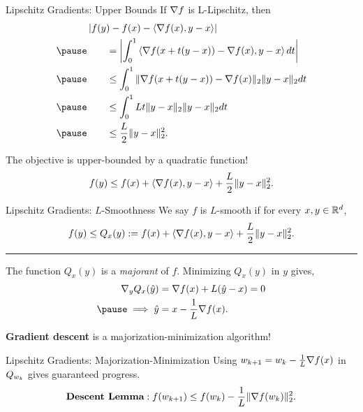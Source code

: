\documentclass[usenames,dvipsnames,mathserif,notheorems]{beamer}
\newcommand{\horizontalrule}{
	{
			\vspace{-0.5em}
			\center \rule{\textwidth}{0.1em}
			\vspace{-0.2em}
		}
}
\newcommand{\bad}[1]{\textcolor{bad}{#1}}
\newcommand{\good}[1]{\textcolor{good}{#1}}
\begin{document}
\begin{frame}{Lipschitz Gradients: Upper Bounds}
    If \( \nabla f \) is L-Lipschitz, then
    \begin{align*}
               & \abs{f(y) - f(x) - \abr{\grad(x), y - x}}                                            \\
        \pause & \hspace{2em} = \abs{\int_0^1 \abr{\grad(x + t(y - x)) - \grad(x), y - x} dt}         \\
        \pause & \hspace{2em} \leq \int_0^1 \norm{\grad(x + t(y - x)) - \grad(x)}_2 \norm{y - x}_2 dt \\
        \pause & \hspace{2em} \leq \int_0^1 L t \norm{y - x}_2 \norm{y - x}_2 dt                      \\
        \pause & \hspace{2em} \leq \frac{L}{2} \norm{y - x}^2_2.
    \end{align*}

    \pause

    The objective is upper-bounded by a \good{quadratic function}!
    \[
        f(y) \leq f(x) + \left\langle\nabla f(x), y - x\right\rangle + \frac{L}{2} \|y - x\|_2^2.
    \]

\end{frame}

\begin{frame}{Lipschitz Gradients: \( L \)-Smoothness}
    We say \( f \) is \good{\( L \)-smooth} if for every \( x, y \in \mathbb{R}^d \),
    \[
        f(y) \leq Q_x(y) := f(x) + \left\langle\nabla f(x), y - x\right\rangle + \frac{L}{2} \|y - x\|_2^2.
    \]

    \pause
    \horizontalrule

    The function \( Q_x(y) \) is a \emph{majorant} of \( f \).
    Minimizing \( Q_x(y) \) in \( y \) gives,
    \begin{align*}
        \nabla_y Q_x(\hat y)
         & = \grad(x) + L (\hat y - x) = 0 \\
        \pause
        \implies
        \hat y
         & = x - \inv{L} \grad(x).
    \end{align*}

    \pause

    \textbf{Gradient descent} is a \bad{majorization-minimization} algorithm!

\end{frame}

\begin{frame}{Lipschitz Gradients: Majorization-Minimization}
    Using \( w_{k+1} = w_k - \frac{1}{L} \nabla f(x) \) in \( Q_{w_k} \)
    gives guaranteed progress.
    \[
        \textbf{Descent Lemma}:
        f(w_{k+1}) \leq f(w_k) - \frac{1}{L} \|\nabla f(w_k)\|_2^2.
    \]

    \pause
    \vspace{3ex}

    \begin{center}
        
    \end{center}
\end{frame}
\end{document}

